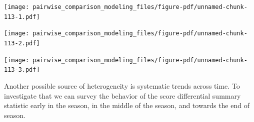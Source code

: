 \documentclass[
  letterpaper,
  DIV=11,
  numbers=noendperiod]{scrartcl}
\newenvironment{Shaded}{\begin{snugshade}}{\end{snugshade}}
\newcommand{\AttributeTok}[1]{\textcolor[rgb]{0.40,0.45,0.13}{#1}}
\newcommand{\DecValTok}[1]{\textcolor[rgb]{0.68,0.00,0.00}{#1}}
\newcommand{\FunctionTok}[1]{\textcolor[rgb]{0.28,0.35,0.67}{#1}}
\newcommand{\NormalTok}[1]{\textcolor[rgb]{0.00,0.23,0.31}{#1}}
\newcommand{\SpecialCharTok}[1]{\textcolor[rgb]{0.37,0.37,0.37}{#1}}
\newcommand{\StringTok}[1]{\textcolor[rgb]{0.13,0.47,0.30}{#1}}
\begin{document}
\begin{Shaded}
\end{Shaded}

\texttt{[image: pairwise\_comparison\_modeling\_files/figure-pdf/unnamed-chunk-113-1.pdf]}

\texttt{[image: pairwise\_comparison\_modeling\_files/figure-pdf/unnamed-chunk-113-2.pdf]}

\texttt{[image: pairwise\_comparison\_modeling\_files/figure-pdf/unnamed-chunk-113-3.pdf]}

Another possible source of heterogeneity is systematic trends across
time. To investigate that we can survey the behavior of the score
differential summary statistic early in the season, in the middle of the
season, and towards the end of season.
\end{document}
